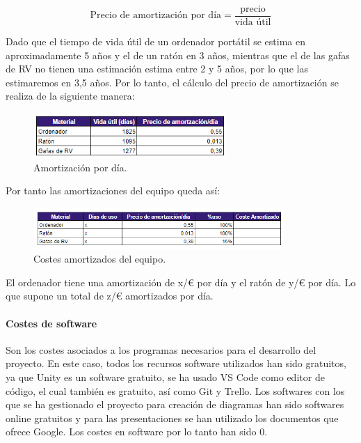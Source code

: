             \[ \text{Precio de amortización por día} = \frac{\text{precio}}{\text{vida útil}} \]

            Dado que el tiempo de vida útil de un ordenador portátil se estima en aproximadamente 5 años y el de un ratón en 3 años, mientras que el de las gafas de RV no tienen una estimación estima entre 2 y 5 años, por lo que las estimaremos en 3,5 años. Por lo tanto, el cálculo del precio de amortización se realiza de la siguiente manera:

            \begin{figure}[H]
                \centering
                \includegraphics[width=0.65\textwidth]{img/precio-amortizado.png}
                \caption{Amortización por día.}
                \label{fig:amortización-diaria}
            \end{figure}

            Por tanto las amortizaciones del equipo queda así:

            \begin{figure}[H]
                \centering
                \includegraphics[width=0.85\textwidth]{img/coste-amortizado.png}
                \caption{Costes amortizados del equipo.}
                \label{fig:coste-amortizado}
            \end{figure}

            El ordenador tiene una amortización de x/€ por día y el ratón de y/€ por día. Lo
            que supone un total de z/€ amortizados por día.


            \paragraph{Costes de software}
            Son los costes asociados a los programas necesarios para el desarrollo del proyecto.
            En este caso, todos los recursos software utilizados han sido gratuitos, ya que Unity es
            un software gratuito, se ha usado VS Code como editor de código, el cual también es gratuito, así como Git y Trello.
            Los softwares con los que se ha gestionado el proyecto para creación de diagramas han sido softwares online gratuitos y para las presentaciones se han utilizado los documentos que ofrece Google. Los costes en software por lo tanto han sido 0.

